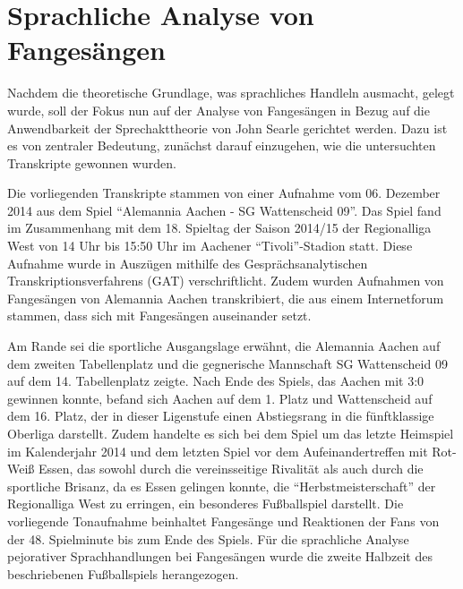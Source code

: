 \section{Sprachliche Analyse von Fangesängen}
Nachdem die theoretische Grundlage, was sprachliches Handleln ausmacht, gelegt wurde, soll der Fokus nun auf der Analyse von Fangesängen in Bezug auf die Anwendbarkeit der Sprechakttheorie von John Searle gerichtet werden.
Dazu ist es von zentraler Bedeutung, zunächst darauf einzugehen, wie die untersuchten Transkripte gewonnen wurden.

Die vorliegenden Transkripte stammen von einer Aufnahme vom 06. Dezember 2014 aus dem Spiel "`Alemannia Aachen - SG Wattenscheid 09"'.
Das Spiel fand im Zusammenhang mit dem 18. Spieltag der Saison 2014/15 der Regionalliga West von 14 Uhr bis 15:50 Uhr im Aachener "`Tivoli"'-Stadion statt.
Diese Aufnahme wurde in Auszügen mithilfe des Gesprächsanalytischen Transkriptionsverfahrens (GAT) verschriftlicht.
Zudem wurden Aufnahmen von Fangesängen von Alemannia Aachen transkribiert, die aus einem Internetforum stammen, dass sich mit Fangesängen auseinander setzt.

Am Rande sei die sportliche Ausgangslage erwähnt, die Alemannia Aachen auf dem zweiten Tabellenplatz und die gegnerische Mannschaft SG Wattenscheid 09 auf dem 14. Tabellenplatz zeigte.
Nach Ende des Spiels, das Aachen mit 3:0 gewinnen konnte, befand sich Aachen auf dem 1. Platz und Wattenscheid auf dem 16. Platz, der in dieser Ligenstufe einen Abstiegsrang in die fünftklassige Oberliga darstellt.
Zudem handelte es sich bei dem Spiel um das letzte Heimspiel im Kalenderjahr 2014 und dem letzten Spiel vor dem Aufeinandertreffen mit Rot-Weiß Essen, das sowohl durch die vereinsseitige Rivalität als auch durch die sportliche Brisanz, da es Essen gelingen konnte, die "`Herbstmeisterschaft"' der Regionalliga West zu erringen, ein besonderes Fußballspiel darstellt.
Die vorliegende Tonaufnahme beinhaltet Fangesänge und Reaktionen der Fans von der 48. Spielminute bis zum Ende des Spiels.
Für die sprachliche Analyse pejorativer Sprachhandlungen bei Fangesängen wurde die zweite Halbzeit des beschriebenen Fußballspiels herangezogen.

